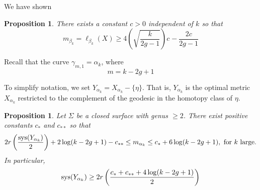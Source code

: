 \documentclass[12pt]{amsart}
\numberwithin{equation}{section}
\theoremstyle{plain}
\newtheorem{prop}[thm]{Proposition}
\begin{document}
 \vspace{20pt} 

We have shown

\begin{prop}\label{prop: bounds on beta}
 There exists a constant $c >0$ independent of $k$ so that   $$m_{\beta_{k}}= \ell_{\beta_{k}}(X) \geq 4 \left( \sqrt{\frac{k}{2g-1}} \right)c_{}  - \frac{2c}{2g -1}$$
\end{prop}

  
\vskip20pt
 Recall that the curve $\gamma_{m,1} = \alpha_{k}$,
where  
$$m = k-2g+1 $$
 

To simplify notation,  we set $Y_{\alpha_k}=X_{\alpha_k}-\{\eta\}$. That is,
$Y_{\alpha_k}$ is the optimal metric $X_{\alpha_k}$ restricted to the complement of the geodesic in the homotopy class of $\eta$.

\begin{prop} \label{prop: bounds on alpha}
Let $\Sigma$ be a closed surface with genus $\geq 2$. There exist positive  constants $c_{*}$ and $c_{**}$  so that 
$$ 2 r\left(\frac{\textup{sys}(Y_{\alpha_k})}{2}\right) + 2 \log (k-2g+1) -c_{**}
\leq m_{\alpha_{k}} \leq   c_* + 6 \log (k-2g+1) ,
 \text{ for $k$ large}.$$
 In particular,  
 \begin{align}
 \textup{sys}(Y_{\alpha_k}) \geq  
 2r \left(\frac{c_* +c_{**}+ 4\log (k-2g+1)}{2}\right)
 \end{align}
\end{prop} 
\end{document}

